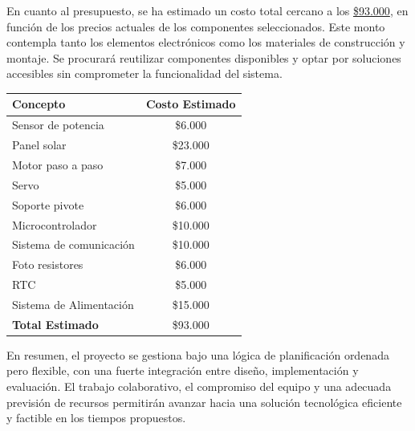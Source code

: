 \documentclass[a4paper,12pt]{article}
\begin{document}
En cuanto al presupuesto, se ha estimado un costo total cercano a los \hyperref[tabla]{\$93.000}, en función de los precios actuales de los componentes seleccionados. Este monto contempla tanto los elementos electrónicos como los materiales de construcción y montaje. Se procurará reutilizar componentes disponibles y optar por soluciones accesibles sin comprometer la funcionalidad del sistema.\\

\begin{table}[h!]
        \centering
        \begin{tabular}{|l|c|}
            \hline
            Concepto  & Costo Estimado \\ 
            \hline
            Sensor de potencia & \$6.000 \\
            Panel solar  & \$23.000 \\
            Motor paso a paso  & \$7.000 \\
            Servo & \$5.000 \\
            Soporte pivote & \$6.000 \\
            Microcontrolador  & \$10.000 \\
            Sistema de comunicación  & \$10.000 \\
            Foto resistores  & \$6.000 \\
            RTC  & \$5.000 \\
            Sistema de Alimentación  & \$15.000 \\
            \hline
            \textbf{Total Estimado} & \$93.000 \\
            \hline
        \end{tabular}
        \label{tabla}
        
    \end{table}

En resumen, el proyecto se gestiona bajo una lógica de planificación ordenada pero flexible, con una fuerte integración entre diseño, implementación y evaluación. El trabajo colaborativo, el compromiso del equipo y una adecuada previsión de recursos permitirán avanzar hacia una solución tecnológica eficiente y factible en los tiempos propuestos.
\end{document}
